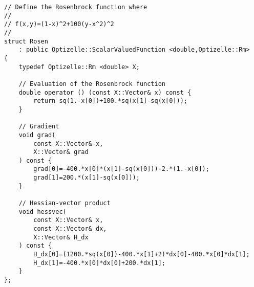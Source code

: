 \begin{lstlisting}[style=C++]
// Define the Rosenbrock function where
// 
// f(x,y)=(1-x)^2+100(y-x^2)^2
//
struct Rosen
    : public Optizelle::ScalarValuedFunction <double,Optizelle::Rm>
{
    typedef Optizelle::Rm <double> X;

    // Evaluation of the Rosenbrock function
    double operator () (const X::Vector& x) const {
        return sq(1.-x[0])+100.*sq(x[1]-sq(x[0]));
    }

    // Gradient
    void grad(
        const X::Vector& x,
        X::Vector& grad
    ) const {
        grad[0]=-400.*x[0]*(x[1]-sq(x[0]))-2.*(1.-x[0]);
        grad[1]=200.*(x[1]-sq(x[0]));
    }

    // Hessian-vector product
    void hessvec(
        const X::Vector& x,
        const X::Vector& dx,
        X::Vector& H_dx
    ) const {
        H_dx[0]=(1200.*sq(x[0])-400.*x[1]+2)*dx[0]-400.*x[0]*dx[1];
        H_dx[1]=-400.*x[0]*dx[0]+200.*dx[1];
    }
};
\end{lstlisting}
